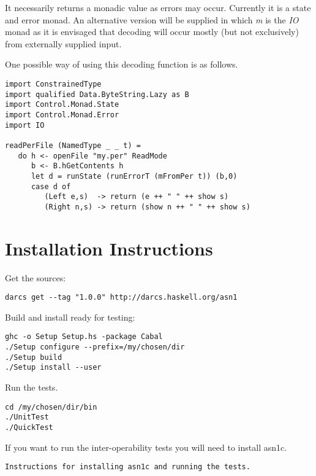 \documentclass{article}
\begin{document}
It necessarily returns a monadic value as errors may occur. Currently it is a state and error monad. 
An alternative version will be supplied
in which {\em m} is the {\em IO} monad as it is envisaged that decoding will occur mostly (but not exclusively)
from externally supplied input.

One possible way of using this decoding function is as follows.

\begin{lstlisting}[frame=single]
import ConstrainedType
import qualified Data.ByteString.Lazy as B
import Control.Monad.State
import Control.Monad.Error
import IO

readPerFile (NamedType _ _ t) =
   do h <- openFile "my.per" ReadMode
      b <- B.hGetContents h
      let d = runState (runErrorT (mFromPer t)) (b,0)
      case d of
         (Left e,s)  -> return (e ++ " " ++ show s)
         (Right n,s) -> return (show n ++ " " ++ show s)
\end{lstlisting}

\section{Installation Instructions}

Get the sources:

\lstset{language=shell,basicstyle=\ttfamily\small}
\begin{lstlisting}[frame=single]
darcs get --tag "1.0.0" http://darcs.haskell.org/asn1
\end{lstlisting}

Build and install ready for testing:

\begin{lstlisting}[frame=single]
ghc -o Setup Setup.hs -package Cabal
./Setup configure --prefix=/my/chosen/dir
./Setup build
./Setup install --user
\end{lstlisting}

Run the tests.

\begin{lstlisting}[frame=single]
cd /my/chosen/dir/bin
./UnitTest
./QuickTest
\end{lstlisting}

If you want to run the inter-operability tests you will need to install asn1c.

\begin{lstlisting}[frame=single]
Instructions for installing asn1c and running the tests.
\end{lstlisting}
\end{document}
